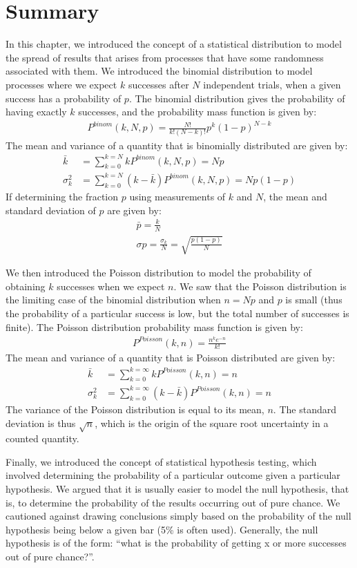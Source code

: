 \section{Summary}
\begin{chapterSummary}
In this chapter, we introduced the concept of a statistical distribution to model the spread of results that arises from processes that have some randomness associated with them. We introduced the binomial distribution to model processes where we expect $k$ successes after $N$ independent trials, when a given success has a probability of $p$. The binomial distribution gives the probability of having exactly $k$ successes, and the probability mass function is given by:
\begin{align}
P^{binom}(k,N,p)=\frac{N!}{k!(N-k)!}p^k(1-p)^{N-k}
\end{align}
The mean and variance of a quantity that is binomially distributed are given by:
\begin{align}
\bar k &= \sum_{k=0}^{k=N}kP^{binom}(k,N,p)=Np\\
\sigma_k^2 &= \sum_{k=0}^{k=N}(k-\bar k)P^{binom}(k,N,p)=Np(1-p)
\end{align}
If determining the fraction $p$ using measurements of $k$ and $N$, the mean and standard deviation of $p$ are given by:
\begin{align}
\bar p = \frac{k}{N}\\
\sigma p = \frac{\sigma_k}{N}=\sqrt{\frac{p(1-p)}{N}}
\end{align}

We then introduced the Poisson distribution to model the probability of obtaining $k$ successes when we expect $n$. We saw that the Poisson distribution is the limiting case of the binomial distribution when $n=Np$ and $p$ is small (thus the probability of a particular success is low, but the total number of successes is finite). The Poisson distribution probability mass function is given by:
\begin{align*}
 P^{Poisson}(k,n)=\frac{n^k e^{-n}}{k!} 
\end{align*}  
The mean and variance of a quantity that is Poisson distributed are given by:
\begin{align}
\bar k &= \sum_{k=0}^{k=\infty}kP^{Poisson}(k,n)=n\\
\sigma_k^2 &= \sum_{k=0}^{k=\infty}(k-\bar k)P^{Poisson}(k,n)=n
\end{align}
The variance of the Poisson distribution is equal to its mean, $n$. The standard deviation is thus $\sqrt{n}$, which is the origin of the square root uncertainty in a counted quantity.

Finally, we introduced the concept of statistical hypothesis testing, which involved determining the probability of a particular outcome given a particular hypothesis. We argued that it is usually easier to model the null hypothesis, that is, to determine the probability of the results occurring out of pure chance. We cautioned against drawing conclusions simply based on the probability of the null hypothesis being below a given bar (5\% is often used). Generally, the null hypothesis is of the form: ``what is the probability of getting x or more successes out of pure chance?''.
\end{chapterSummary}